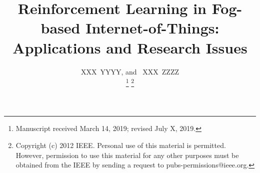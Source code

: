 \documentclass[journal]{IEEEtran}
\begin{document}
%
\title{Reinforcement Learning in Fog-based Internet-of-Things: Applications and Research Issues}
%
%
%

\author{XXX~YYYY,
        and~ XXX~ZZZZ%

\thanks{Manuscript received March 14, 2019; revised July X, 2019.}
\thanks{Copyright (c) 2012 IEEE. Personal use of this material is permitted. However, permission to use this material for any other purposes must be obtained from the IEEE by sending a request to pubs-permissions@ieee.org.}
}

%
%
\end{document}
